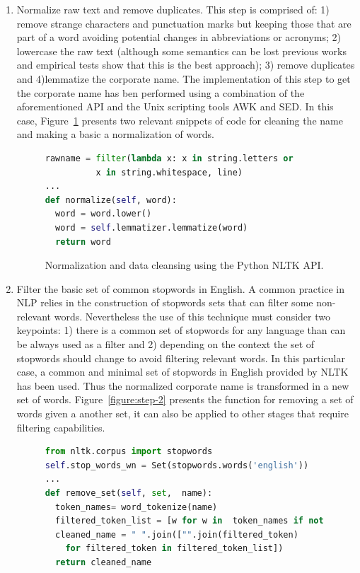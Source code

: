 \documentclass{llncs}
\begin{document}
\begin{enumerate}
 \item Normalize raw text and remove duplicates. This step is comprised of: 1) remove strange characters and punctuation marks but keeping 
 those that are part of a word avoiding potential changes in  abbreviations or acronyms; 2) lowercase the raw text (although some semantics can 
 be lost previous works and empirical tests show that this is the best approach); 3) remove duplicates and 4)lemmatize the corporate name. 
 The implementation of this step to get the corporate name has ben performed using a combination of the aforementioned API and 
 the Unix scripting tools AWK and SED. In this case, Figure~\ref{figure:step-1} presents 
 two relevant snippets of code for cleaning the name and making a basic a normalization of words. 
 
\begin{figure}[!h]
\begin{center}
\begin{lstlisting}[language=Python]        
rawname = filter(lambda x: x in string.letters or 
	      x in string.whitespace, line)
...
def normalize(self, word):
  word = word.lower()
  word = self.lemmatizer.lemmatize(word)
  return word
\end{lstlisting}
\caption{Normalization and data cleansing using the Python NLTK API.}
\label{figure:step-1}
\end{center}
\end{figure}


   
\item Filter the basic set of common stopwords in English. A common practice in NLP relies in the construction 
of stopwords sets that can filter some non-relevant words. Nevertheless the use of this technique must 
consider two keypoints: 1) there is a common set of stopwords for any language than can be always used as a filter and 
2) depending on the context the set of stopwords should change to avoid filtering relevant words. In this particular 
case, a common and minimal set of stopwords in English provided by NLTK has been used. Thus the normalized corporate name is 
transformed in a new set of words. Figure~\ref{figure:step-2} presents the function for removing a set of 
words given a another set, it can also be applied to other stages that require filtering capabilities.

\begin{figure}[!h]
\begin{center}
\begin{lstlisting}[language=Python] 
from nltk.corpus import stopwords
self.stop_words_wn = Set(stopwords.words('english'))
...
def remove_set(self, set,  name): 
  token_names= word_tokenize(name)       
  filtered_token_list = [w for w in  token_names if not w in set ]
  cleaned_name = " ".join(["".join(filtered_token) 
    for filtered_token in filtered_token_list])
  return cleaned_name
  

\end{lstlisting}
\end{center}
\end{figure}
\end{enumerate}
\end{document}
